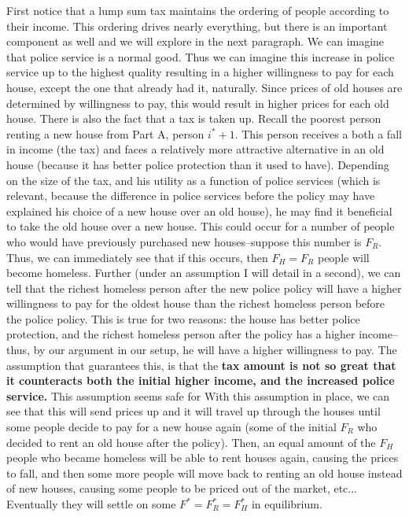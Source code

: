 \documentclass[12pt]{paper}
\begin{document}
First notice that a lump sum tax maintains the ordering of people according to their income. This ordering drives nearly everything, but there is an important component as well and we will explore in the next paragraph. We can imagine that police service is a normal good. Thus we can imagine this increase in police service up to the highest quality resulting in a higher willingness to pay for each house, except the one that already had it, naturally. Since prices of old houses are determined by willingness to pay, this would result in higher prices for each old house. There is also the fact that a tax is taken up. Recall the poorest person renting a new house from Part A, person $i^*+1$. This person receives a both a fall in income (the tax) and faces a relatively more attractive alternative in an old house (because it has better police protection than it used to have). Depending on the size of the tax, and his utility as a function of police services (which is relevant, because the difference in police services before the policy may have explained his choice of a new house over an old house), he may find it beneficial to take the old house over a new house. This could occur for a number of people who would have previously purchased new houses--suppose this number is $F_R$.\\


Thus, we can immediately see that if this occurs, then $F_H=F_R$ people will become homeless. Further (under an assumption I will detail in a second), we can tell that the richest homeless person after the new police policy will have a higher willingness to pay for the oldest house than the richest homeless person before the police policy. This is true for two reasons: the house has better police protection, and the richest homeless person after the policy has a higher income--thus, by our argument in our setup, he will have a higher willingness to pay. The assumption that guarantees this, is that the \textbf{tax amount is not so great that it counteracts both the initial higher income, and the increased police service.} This assumption seems safe for With this assumption in place, we can see that this will send prices up and it will travel up through the houses until some people decide to pay for a new house again (some of the initial $F_R$ who decided to rent an old house after the policy). Then, an equal amount of the $F_H$ people who became homeless will be able to rent houses again, causing the prices to fall, and then some more people will move back to renting an old house instead of new houses, causing some people to be priced out of the market, etc... Eventually they will settle on some $F^*=F^*_R=F^*_H$ in equilibrium.\\
\end{document}
